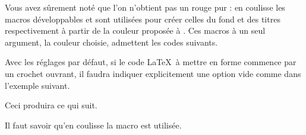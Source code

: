 \documentclass[10pt, a4paper]{article}
\begin{document}
\begin{tdocnote}
    Vous avez sûrement noté que l'on n'obtient pas un rouge pur : en coulisse les macros développables  et  sont utilisées pour créer celles du fond et des titres respectivement à partir de la couleur proposée à .
	Ces macros à un seul argument, la couleur choisie, admettent les codes suivants.

	\begin{tdoclatex}[code]
	\end{tdoclatex}
\end{tdocnote}




\begin{tdocwarn}
    Avec les réglages par défaut, si le code \LaTeX\ à mettre en forme commence par un crochet ouvrant, il faudra indiquer explicitement une option vide comme dans l'exemple suivant.


    Ceci produira ce qui suit.

    \medskip

    
\end{tdocwarn}


\begin{tdocnote}
    Il faut savoir qu'en coulisse la macro  est utilisée.

    \begin{tdoclatex}[std]
    \end{tdoclatex}
\end{tdocnote}
\end{document}
